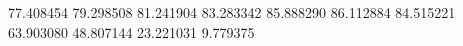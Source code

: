77.408454
79.298508
81.241904
83.283342
85.888290
86.112884
84.515221
63.903080
48.807144
23.221031
9.779375
